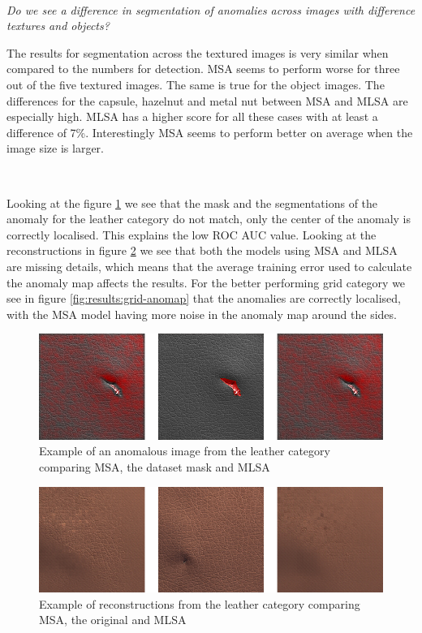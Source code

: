 \

\textit{Do we see a difference in segmentation of anomalies across images with difference textures and objects?}

The results for segmentation across the textured images is very similar when compared to the numbers for detection. MSA seems to perform worse for three out of the five textured images. The same is true for the object images. The differences for the capsule, hazelnut and metal nut between MSA and MLSA are especially high. MLSA has a higher score for all these cases with at least a difference of 7\%. Interestingly MSA seems to perform better on average when the image size is larger.

\

Looking at the figure \ref{fig:results:leather-anomap} we see that the mask and the segmentations of the anomaly for the leather category do not match, only the center of the anomaly is correctly localised. This explains the low ROC AUC value. Looking at the reconstructions in figure \ref{fig:results:leather-recon} we see that both the models using MSA and MLSA are missing details, which means that the average training error used to calculate the anomaly map affects the results. For the better performing grid category we see in figure \ref{fig:results:grid-anomap} that the anomalies are correctly localised, with the MSA model having more noise in the anomaly map around the sides.

\begin{figure}[ht!]
\centering
\includegraphics[width=\textwidth]{imgs/samples/leather_cut_anomap.jpg}
\caption{Example of an anomalous image from the leather category comparing MSA, the dataset mask and MLSA}
\label{fig:results:leather-anomap}
\end{figure}

\begin{figure}[ht!]
\centering
\includegraphics[width=\textwidth]{imgs/samples/leather_poke_recon.jpg}
\caption{Example of reconstructions from the leather category comparing MSA, the original and MLSA}
\label{fig:results:leather-recon}
\end{figure}

